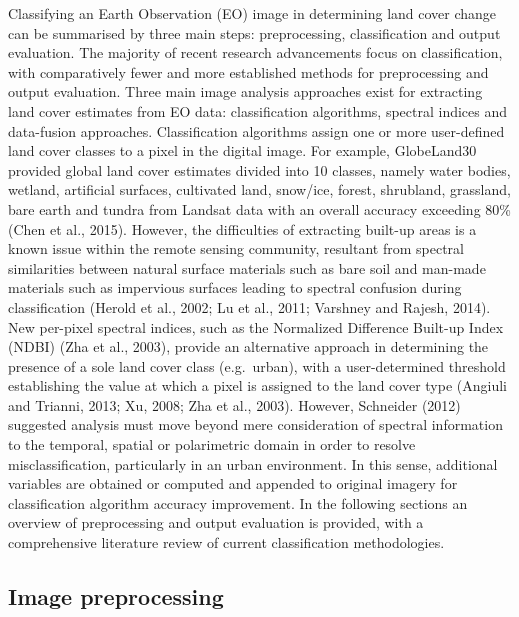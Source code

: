 \documentclass[]{book}
\begin{document}
Classifying an Earth Observation (EO) image in determining land cover
change can be summarised by three main steps: preprocessing,
classification and output evaluation. The majority of recent research
advancements focus on classification, with comparatively fewer and more
established methods for preprocessing and output evaluation. Three main
image analysis approaches exist for extracting land cover estimates from
EO data: classification algorithms, spectral indices and data-fusion
approaches. Classification algorithms assign one or more user-defined
land cover classes to a pixel in the digital image. For example,
GlobeLand30 provided global land cover estimates divided into 10
classes, namely water bodies, wetland, artificial surfaces, cultivated
land, snow/ice, forest, shrubland, grassland, bare earth and tundra from
Landsat data with an overall accuracy exceeding 80\% (Chen et al.,
2015). However, the difficulties of extracting built-up areas is a known
issue within the remote sensing community, resultant from spectral
similarities between natural surface materials such as bare soil and
man-made materials such as impervious surfaces leading to spectral
confusion during classification (Herold et al., 2002; Lu et al., 2011;
Varshney and Rajesh, 2014). New per-pixel spectral indices, such as the
Normalized Difference Built-up Index (NDBI) (Zha et al., 2003), provide
an alternative approach in determining the presence of a sole land cover
class (e.g.~urban), with a user-determined threshold establishing the
value at which a pixel is assigned to the land cover type (Angiuli and
Trianni, 2013; Xu, 2008; Zha et al., 2003). However, Schneider (2012)
suggested analysis must move beyond mere consideration of spectral
information to the temporal, spatial or polarimetric domain in order to
resolve misclassification, particularly in an urban environment. In this
sense, additional variables are obtained or computed and appended to
original imagery for classification algorithm accuracy improvement. In
the following sections an overview of preprocessing and output
evaluation is provided, with a comprehensive literature review of
current classification methodologies.

\subsection{Image preprocessing}\label{image-preprocessing}
\end{document}
